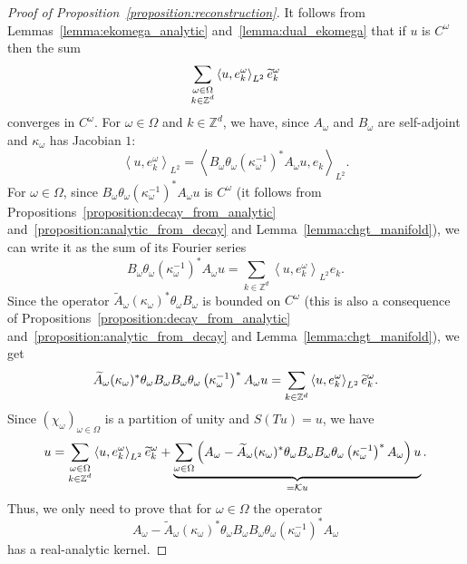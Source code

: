 \documentclass[10pt]{amsart}
\theoremstyle{definition}\newtheorem{defi}[theo]{Definition}\newtheorem{rema}[theo]{Remark}\newtheorem{exam}[theo]{Example}\newtheorem{exem}[theo]{Example}\newtheorem{nota}[theo]{Notation}
\newcommand{\p}[1]{\left(#1\right)}
\newcommand{\clK}{\mathcal{K}}
\newcommand{\bbZ}{\mathbb{Z}}
\let\oldtilde\tilde
\renewcommand*{\tilde}[1]{\mathchoice{\widetilde{#1}}{\widetilde{#1}}{\oldtilde{#1}}{\oldtilde{#1}}}
\begin{document}
\begin{proof}[Proof of Proposition~\ref{proposition:reconstruction}]
It follows from Lemmas~\ref{lemma:ekomega_analytic} and~\ref{lemma:dual_ekomega} that if $u$ is $C^\omega$ then the sum
\[
\sum_{\substack{\omega \in \Omega \\ k \in \bbZ^d}} \left\langle u, e_k^\omega \right\rangle_{L^2} \tilde{e}_k^\omega
\]
converges in $C^\omega$. For $\omega \in \Omega$ and $k \in \bbZ^d$, we have, since $A_\omega$ and $B_\omega$ are self-adjoint and $\kappa_\omega$ has Jacobian $1$:
\begin{equation*}
\left\langle u, e_k^\omega\right\rangle_{L^2} = \left\langle B_\omega \theta_\omega \left(\kappa_\omega^{-1}\right)^* A_\omega u, e_k\right\rangle_{L^2}.
\end{equation*}
For $\omega \in \Omega$, since $B_\omega \theta_\omega (\kappa_\omega^{-1})^* A_\omega u$ is $C^\omega$ (it follows from Propositions~\ref{proposition:decay_from_analytic} and~\ref{proposition:analytic_from_decay} and Lemma~\ref{lemma:chgt_manifold}), we can write it as the sum of its Fourier series
\begin{equation*}
B_\omega \theta_\omega \left(\kappa_\omega^{-1}\right)^* A_\omega u = \sum_{k \in \bbZ^d} \left\langle u, e_k^\omega\right\rangle_{L^2} e_k.
\end{equation*}
Since the operator $\widetilde{A}_\omega (\kappa_\omega)^* \theta_\omega B_\omega $ is bounded on $C^\omega$ (this is also a consequence of Propositions~\ref{proposition:decay_from_analytic} and~\ref{proposition:analytic_from_decay} and Lemma~\ref{lemma:chgt_manifold}), we get
\begin{equation*}
\widetilde{A}_\omega (\kappa_\omega)^* \theta_\omega B_\omega B_\omega \theta_\omega \left(\kappa_\omega^{-1}\right)^* A_\omega u = \sum_{k \in \bbZ^d} \left\langle u, e_k^\omega \right\rangle_{L^2} \tilde{e}_k^\omega.
\end{equation*}
Since $(\chi_\omega)_{\omega \in \Omega}$ is a partition of unity and $S(Tu) = u$, we have
\begin{equation*}
u = \sum_{\substack{\omega \in \Omega \\ k \in \bbZ^d}} \left\langle u, e_k^\omega \right\rangle_{L^2} \tilde{e}_k^\omega + \underbrace{\sum_{\omega \in \Omega} \p{A_\omega - \widetilde{A}_\omega (\kappa_\omega)^* \theta_\omega B_\omega B_\omega \theta_\omega \left(\kappa_\omega^{-1}\right)^* A_\omega}u}_{= \clK u}.
\end{equation*}
Thus, we only need to prove that for $\omega \in \Omega$ the operator
\begin{equation}\label{eq:analytic_whole}
A_\omega - \widetilde{A}_\omega (\kappa_\omega)^* \theta_\omega B_\omega B_\omega \theta_\omega \left(\kappa_\omega^{-1}\right)^* A_\omega
\end{equation}
has a real-analytic kernel.


\end{proof}
\end{document}
